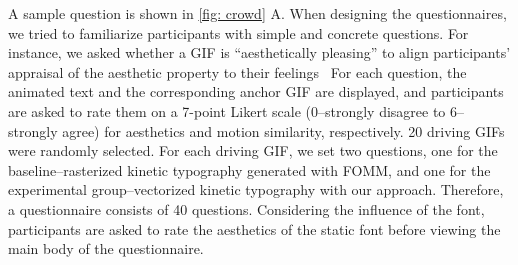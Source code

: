 A sample question is shown in \autoref{fig: crowd} A.
When designing the questionnaires, we tried to familiarize participants with simple and concrete questions.
For instance, we asked whether a GIF is ``aesthetically pleasing'' to align participants' appraisal of the aesthetic property to their feelings~\cite{AestheticPrinciples}
For each question, the animated text and the corresponding anchor GIF are displayed, and participants are asked to rate them on a 7-point Likert scale (0--strongly disagree to 6--strongly agree) for aesthetics and motion similarity, respectively. 
20 driving GIFs were randomly selected.
For each driving GIF, we set two questions, one for the baseline--rasterized kinetic typography generated with FOMM, and one for the experimental group--vectorized kinetic typography with our approach.
Therefore, a questionnaire consists of 40 questions.
Considering the influence of the font, participants are asked to rate the aesthetics of the static font before viewing the main body of the questionnaire.

